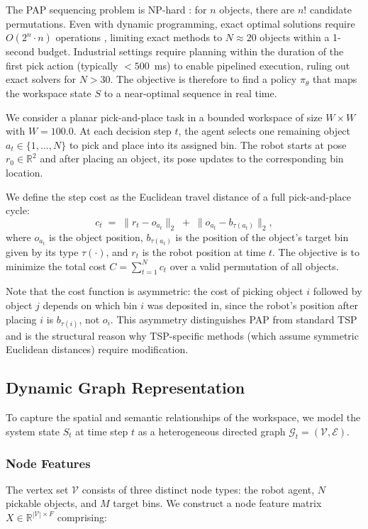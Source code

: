 \documentclass[conference]{IEEEtran}
\begin{document}
The PAP sequencing problem is NP-hard \cite{chalasani1996}: for $n$ objects, there are $n!$ candidate permutations. Even with dynamic programming, exact optimal solutions require $O(2^n \cdot n)$ operations \cite{han2019pap}, limiting exact methods to $N \approx 20$ objects within a 1-second budget. Industrial settings require planning within the duration of the first pick action (typically $<500$~ms) to enable pipelined execution, ruling out exact solvers for $N > 30$. The objective is therefore to find a policy $\pi_\theta$ that maps the workspace state $S$ to a near-optimal sequence in real time.

We consider a planar pick-and-place task in a bounded workspace of size $W \times W$ with $W = 100.0$. 
At each decision step $t$, the agent selects one remaining object $a_t \in \{1,\dots,N\}$ to pick and place into its assigned bin. 
The robot starts at pose $r_0 \in \mathbb{R}^2$ and after placing an object, its pose updates to the corresponding bin location.

We define the step cost as the Euclidean travel distance of a full pick-and-place cycle:
\begin{equation}
c_t \;=\; \lVert r_t - o_{a_t} \rVert_2 \;+\; \lVert o_{a_t} - b_{\tau(a_t)} \rVert_2,
\end{equation}
where $o_{a_t}$ is the object position, $b_{\tau(a_t)}$ is the position of the object's target bin given by its type $\tau(\cdot)$, and $r_t$ is the robot position at time $t$. 
The objective is to minimize the total cost $C = \sum_{t=1}^{N} c_t$ over a valid permutation of all objects.

Note that the cost function is asymmetric: the cost of picking object $i$ followed by object $j$ depends on which bin $i$ was deposited in, since the robot's position after placing $i$ is $b_{\tau(i)}$, not $o_i$. This asymmetry distinguishes PAP from standard TSP and is the structural reason why TSP-specific methods (which assume symmetric Euclidean distances) require modification.

\subsection{Dynamic Graph Representation}
To capture the spatial and semantic relationships of the workspace, we model the system state $S_t$ at time step $t$ as a heterogeneous directed graph $\mathcal{G}_t = (\mathcal{V}, \mathcal{E})$.

\subsubsection{Node Features}
The vertex set $\mathcal{V}$ consists of three distinct node types: the robot agent, $N$ pickable objects, and $M$ target bins. We construct a node feature matrix $X \in \mathbb{R}^{|\mathcal{V}| \times F}$ comprising:
\end{document}
